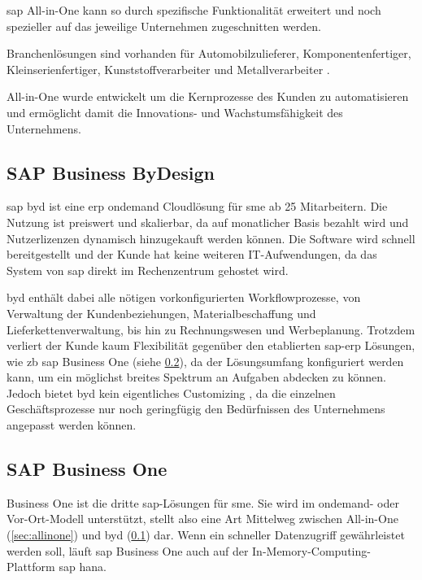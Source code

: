 \gls{sap} All-in-One kann so durch spezifische Funktionalität erweitert und noch spezieller auf das jeweilige Unternehmen zugeschnitten werden.

Branchenlösungen sind vorhanden für Automobilzulieferer, Komponentenfertiger, Kleinserienfertiger, Kunststoffverarbeiter und Metallverarbeiter \cite{AiOBeratung}.

All-in-One wurde entwickelt um die Kernprozesse des Kunden zu automatisieren und ermöglicht damit die Innovations- und Wachstumsfähigkeit des Unternehmens.

\subsection{SAP Business ByDesign}
\label{sec:byd}

\gls{sap} \gls{byd} ist eine \gls{erp} \gls{ondemand} Cloudlösung für \gls{sme} ab 25 Mitarbeitern. Die Nutzung ist preiswert und skalierbar, da auf monatlicher Basis bezahlt wird und Nutzerlizenzen dynamisch hinzugekauft werden können. Die Software wird schnell bereitgestellt und der Kunde hat keine weiteren IT-Aufwendungen, da das System von \gls{sap} direkt im Rechenzentrum gehostet wird.

\gls{byd} enthält dabei alle nötigen vorkonfigurierten Workflowprozesse, von Verwaltung der Kundenbeziehungen, Materialbeschaffung und Lieferkettenverwaltung, bis hin zu Rechnungswesen und Werbeplanung. Trotzdem verliert der Kunde kaum Flexibilität gegenüber den etablierten \gls{sap}-\gls{erp} Lösungen, wie \gls{zb} \gls{sap} Business One (siehe \ref{sec:business-one}), da der Lösungsumfang konfiguriert werden kann, um ein möglichst breites Spektrum an Aufgaben abdecken zu können. Jedoch bietet \gls{byd} kein eigentliches Customizing \cite{ERP4Students}, da die einzelnen Geschäftsprozesse nur noch geringfügig den Bedürfnissen des Unternehmens angepasst werden können.

\subsection{SAP Business One}
\label{sec:business-one}

Business One ist die dritte \gls{sap}-Lösungen für \gls{sme}. Sie wird im \gls{ondemand}- oder Vor-Ort-Modell unterstützt, stellt also eine Art Mittelweg zwischen All-in-One (\ref{sec:allinone}) und \gls{byd} (\ref{sec:byd}) dar. Wenn ein schneller Datenzugriff gewährleistet werden soll, läuft \gls{sap} Business One auch auf der In-Memory-Computing-Plattform \gls{sap} \gls{hana}.

